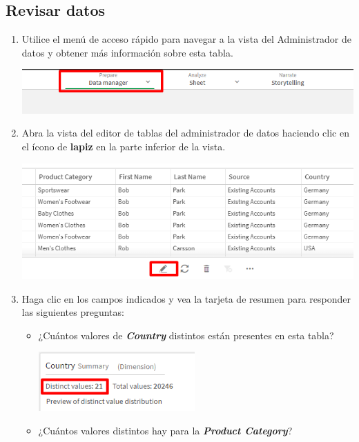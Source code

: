 \documentclass[12pt,letterpaper]{article}
\newcommand\tab[1][1cm]{\hspace*{#1}}
\begin{document}
    \subsection{Revisar datos}
    \begin{enumerate}[\tab 1.]
        \item Utilice el menú de acceso rápido para navegar a la vista del Administrador de datos y obtener más información sobre esta tabla.
        \begin{center}
            \includegraphics[width=13cm]{./img/img3.png}
        \end{center}
        \item Abra la vista del editor de tablas del administrador de datos haciendo clic en el ícono de \textbf{lapiz} en la parte inferior de la vista.
        \begin{center}
            \includegraphics[width=13cm]{./img/img4.png}
        \end{center}
        \item Haga clic en los campos indicados y vea la tarjeta de resumen para responder las siguientes preguntas:
        \begin{itemize}
            \item ¿Cuántos valores de \textit{\textbf{Country}} distintos están presentes en esta tabla?
            \begin{center}
                \includegraphics[width=6cm]{./img/img5.1.png}
            \end{center}
            \item ¿Cuántos valores distintos hay para la \textit{\textbf{Product Category}}?

\end{itemize}
\end{enumerate}
\end{document}
